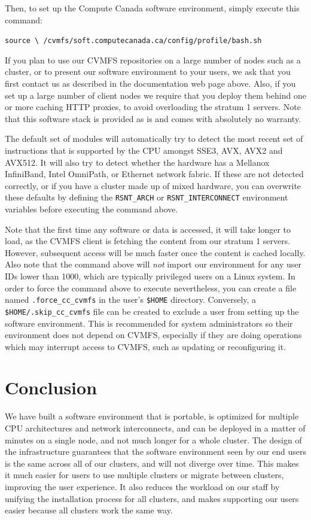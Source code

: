 \documentclass[sigconf]{acmart}
\begin{document}
Then, to set up the Compute Canada software environment, simply execute this command: 

\begin{center}
\texttt{source \textbackslash \linebreak
/cvmfs/soft.computecanada.ca/config/profile/bash.sh}
\end{center}

If you plan to use our CVMFS repositories on a large number of nodes such as a cluster, or to present our software environment to your users, we ask that you first contact us as described in the documentation web page above. Also, if you set up a large number of client nodes we require that you deploy them behind one or more caching HTTP proxies, to avoid overloading the stratum 1 servers. Note that this software stack is provided as is and comes with absolutely no warranty. 

The default set of modules will automatically try to detect the most recent set of instructions that is supported by the CPU amongst  SSE3, AVX, AVX2 and AVX512. It will also try to detect whether the hardware has a Mellanox InfiniBand, Intel OmniPath, or Ethernet network fabric. If these are not detected correctly, or if you have a cluster made up of mixed hardware, you can overwrite these defaults by defining the \texttt{RSNT\_ARCH} or \texttt{RSNT\_INTERCONNECT} environment variables before executing the command above. 

Note that the first time any software or data is accessed, it will take longer to load, as the CVMFS client is fetching the content from our stratum 1 servers. However, subsequent access will be much faster once the content is cached locally. 
Also note that the command above will {\it not} import our environment for any user IDs lower than 1000, which are typically privileged users on a Linux system. In order to force the command above to execute nevertheless, you can create a file named \texttt{.force\_cc\_cvmfs} in the user's \texttt{\$HOME} directory. Conversely, a \texttt{\$HOME/.skip\_cc\_cvmfs} file can be created to exclude a user from setting up the software environment. This is recommended for system administrators so their environment does not depend on CVMFS, especially if they are doing operations which may interrupt access to CVMFS, such as updating or reconfiguring it.


\section{Conclusion}
\label{sec:Conclusion}
We have built a software environment that is portable, is optimized for multiple CPU architectures and network interconnects, and can be deployed in a matter of minutes on a single node, and not much longer for a whole cluster. The design of the infrastructure guarantees that the software environment seen by our end users is the same across all of our clusters, and will not diverge over time. This makes it much easier for users to use multiple clusters or migrate between clusters, improving the user experience. It also reduces the workload on our staff by unifying the installation process for all clusters, and makes supporting our users easier because all clusters work the same way.
\end{document}
